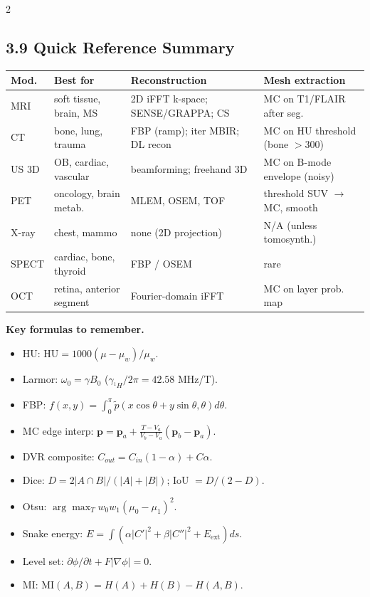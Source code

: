 \begin{paracol}{2}
\switchcolumn*

\subsection*{3.9 Quick Reference Summary}
\scriptsize
\setlength{\tabcolsep}{2pt}
\begin{tabular}{@{}p{1.1cm}p{2.2cm}p{2.5cm}p{2.5cm}@{}}
\toprule
Mod. & Best for & Reconstruction & Mesh extraction \\
\midrule
MRI & soft tissue, brain, MS & 2D iFFT k-space; SENSE/GRAPPA; CS & MC on T1/FLAIR after seg. \\
CT & bone, lung, trauma & FBP (ramp); iter MBIR; DL recon & MC on HU threshold (bone $>$300) \\
US 3D & OB, cardiac, vascular & beamforming; freehand 3D & MC on B-mode envelope (noisy) \\
PET & oncology, brain metab. & MLEM, OSEM, TOF & threshold SUV $\to$ MC, smooth \\
X-ray & chest, mammo & none (2D projection) & N/A (unless tomosynth.) \\
SPECT & cardiac, bone, thyroid & FBP / OSEM & rare \\
OCT & retina, anterior segment & Fourier-domain iFFT & MC on layer prob. map \\
\bottomrule
\end{tabular}
\normalsize

\medskip
\textbf{Key formulas to remember.}
\begin{itemize}[leftmargin=*,nosep]
  \item HU: $\mathrm{HU}=1000(\mu-\mu_w)/\mu_w$.
  \item Larmor: $\omega_0=\gamma B_0$ ($\gamma_{^1\!H}/2\pi=42.58$ MHz/T).
  \item FBP: $f(x,y)=\!\int_0^\pi\!\tilde p(x\cos\theta+y\sin\theta,\theta)d\theta$.
  \item MC edge interp: $\mathbf p=\mathbf p_a+\frac{T-V_a}{V_b-V_a}(\mathbf p_b-\mathbf p_a)$.
  \item DVR composite: $C_{out}=C_{in}(1-\alpha)+C\alpha$.
  \item Dice: $D=2|A\cap B|/(|A|+|B|)$; IoU $=D/(2-D)$.
  \item Otsu: $\arg\max_T w_0w_1(\mu_0-\mu_1)^2$.
  \item Snake energy: $E=\!\int(\alpha|C'|^2+\beta|C''|^2+E_{\text{ext}})ds$.
  \item Level set: $\partial\phi/\partial t+F|\nabla\phi|=0$.
  \item MI: $\mathrm{MI}(A,B)=H(A)+H(B)-H(A,B)$.
\end{itemize}


\end{paracol}
